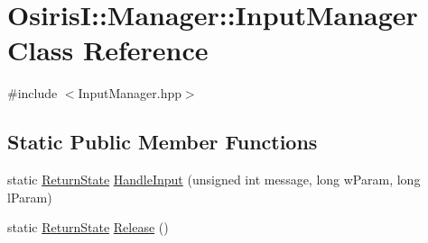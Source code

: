 \hypertarget{class_osiris_i_1_1_manager_1_1_input_manager}{\section{Osiris\-I\-:\-:Manager\-:\-:Input\-Manager Class Reference}
\label{class_osiris_i_1_1_manager_1_1_input_manager}
}


{\ttfamily \#include $<$Input\-Manager.\-hpp$>$}

\subsection*{Static Public Member Functions}
\begin{DoxyCompactItemize}
\item 
static \hyperlink{namespace_osiris_i_a8f53bf938dc75c65c6a529694514013e}{Return\-State} \hyperlink{class_osiris_i_1_1_manager_1_1_input_manager_a21e1e71b86175367e6ac22109e86dd43}{Handle\-Input} (unsigned int message, long w\-Param, long l\-Param)
\item 
static \hyperlink{namespace_osiris_i_a8f53bf938dc75c65c6a529694514013e}{Return\-State} \hyperlink{class_osiris_i_1_1_manager_1_1_input_manager_a6ba760bc37fc7c5c7e4154141321977e}{Release} ()
\end{DoxyCompactItemize}


